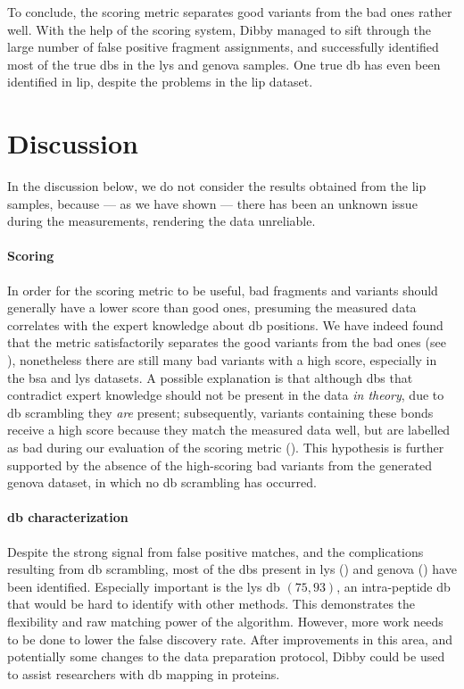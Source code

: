 To conclude, the scoring metric separates good variants from the bad ones rather well. With the help of the scoring system, Dibby managed to sift through the large number of false positive fragment assignments, and successfully identified most of the true \glspl*{db} in the \gls*{lys} and \gls*{genova} samples. One true \gls*{db} has even been identified in \gls*{lip}, despite the problems in the \gls*{lip} dataset.


\section{Discussion}

In the discussion below, we do not consider the results obtained from the \gls*{lip} samples, because --- as we have shown --- there has been an unknown issue during the measurements, rendering the data unreliable.

\paragraph{Scoring} In order for the scoring metric to be useful, bad fragments and variants should generally have a lower score than good ones, presuming the measured data correlates with the expert knowledge about \gls*{db} positions. We have indeed found that the metric satisfactorily separates the good variants from the bad ones (see ), nonetheless there are still many bad variants with a high score, especially in the \gls*{bsa} and \gls*{lys} datasets. A possible explanation is that although \glspl*{db} that contradict expert knowledge should not be present in the data \emph{in theory}, due to \gls*{db} scrambling they \emph{are} present; subsequently, variants containing these bonds receive a high score because they match the measured data well, but are labelled as bad during our evaluation of the scoring metric (). This hypothesis is further supported by the absence of the high-scoring bad variants from the generated \gls*{genova} dataset, in which no \gls*{db} scrambling has occurred.

\paragraph{\gls*{db} characterization} Despite the strong signal from false positive matches, and the complications resulting from \gls*{db} scrambling, most of the \glspl*{db} present in \gls*{lys} () and \gls*{genova} () have been identified. Especially important is the \gls*{lys} \gls*{db} \((75, 93)\), an intra-peptide \gls*{db} that would be hard to identify with other methods. This demonstrates the flexibility and raw matching power of the algorithm. However, more work needs to be done to lower the false discovery rate. After improvements in this area, and potentially some changes to the data preparation protocol, Dibby could be used to assist researchers with \gls*{db} mapping in proteins.

